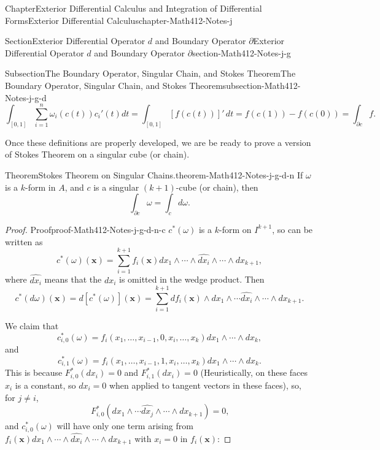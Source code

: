 \documentclass[oneside,10pt,]{book}
\numberwithin{equation}{section}
\newcommand{\bx}{\mathbf{x}}
\begin{document}
\begin{chapterptx}{Chapter}{Exterior Differential Calculus and Integration of Differential Forms}{}{Exterior Differential Calculus}{}{}{chapter-Math412-Notes-j}
\begin{sectionptx}{Section}{Exterior Differential Operator \(d\) and Boundary Operator \(\partial\)}{}{Exterior Differential Operator \(d\) and Boundary Operator \(\partial\)}{}{}{section-Math412-Notes-j-g}
\begin{subsectionptx}{Subsection}{The Boundary Operator, Singular Chain, and Stokes Theorem}{}{The Boundary Operator, Singular Chain, and Stokes Theorem}{}{}{subsection-Math412-Notes-j-g-d}
\begin{equation*}
\int_{[0, 1]} \sum_{i=1}^{n}\omega_{i}(c(t))c_{i}'(t)dt
=\int_{[0, 1]} [f(c(t))]'\, dt=f(c(1))-f(c(0))= \int_{\partial c} f.
\end{equation*}
%
\par
Once these definitions are properly developed, we are be ready to prove a version of Stokes Theorem on a singular cube (or chain).%
\begin{theorem}{Theorem}{Stokes Theorem on Singular Chains.}{}{theorem-Math412-Notes-j-g-d-n}%
If \(\omega\) is  a \(k\)-form in \(A\), and \(c\) is a singular \((k+1)\)-cube (or chain), then%
\begin{equation*}
\int_{\partial c} \omega = \int_{c} d\omega.
\end{equation*}
\end{theorem}
\begin{proof}{Proof}{}{proof-Math412-Notes-j-g-d-n-c}
\(c^{*}(\omega)\) is a \(k\)-form on \(I^{k+1}\), so can be written as%
\begin{equation*}
c^{*}(\omega)(\bx)=\sum_{i=1}^{k+1}f_{i}(\bx) dx_{1}\wedge \cdots \wedge\widehat{dx_{i}}\wedge \cdots \wedge dx_{k+1},
\end{equation*}
where  \(\widehat{dx_{i}}\) means that the \(dx_{i}\) is omitted in the wedge product. Then%
\begin{equation*}
c^{*}(d \omega)(\bx)=d \left[ c^{*}( \omega)\right](\bx)=
\sum_{i=1}^{k+1}df_{i}(\bx)\wedge dx_{1}\wedge \cdots \widehat{dx_{i}}\wedge \cdots \wedge dx_{k+1}.
\end{equation*}
%
\par
We claim that%
\begin{equation*}
c_{i, 0}^{*}(\omega) = f_{i}(x_{1},\ldots, x_{i-1}, 0, x_{i}, \ldots, x_{k}) dx_{1}\wedge \cdots \wedge dx_{k},
\end{equation*}
and%
\begin{equation*}
c_{i, 1}^{*}(\omega) = f_{i}(x_{1},\ldots, x_{i-1}, 1, x_{i}, \ldots, x_{k}) dx_{1}\wedge \cdots \wedge dx_{k}.
\end{equation*}
This is because \(F_{i, 0}^{*}(dx_{i})=0\) and \(F_{i, 1}^{*}(dx_{i})=0\) (Heuristically, on these faces \(x_{i}\) is a constant, so \(dx_{i}=0\) when applied to tangent vectors in these faces), so, for \(j\ne i\),%
\begin{equation*}
F_{i, 0}^{*} (dx_{1}\wedge \cdots \widehat{dx_{j}}\wedge \cdots \wedge dx_{k+1})=0\text{,}
\end{equation*}
and \(c_{i, 0}^{*}(\omega)\) will have only one term arising from \(f_{i}(\bx) dx_{1}\wedge \cdots \wedge\widehat{dx_{i}}\wedge \cdots \wedge dx_{k+1}\) with \(x_{i}=0\) in \(f_{i}(\bx)\):%

\end{proof}
\end{subsectionptx}
\end{sectionptx}
\end{chapterptx}
\end{document}
